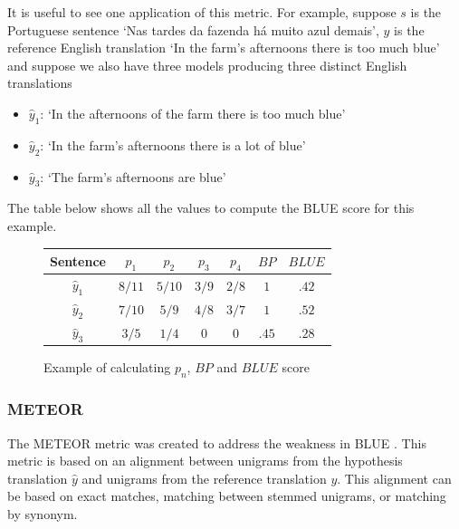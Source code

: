 It is useful to see one application of this metric. For example, suppose $s$ is the Portuguese sentence `Nas tardes da fazenda há muito azul demais', $y$ is the reference English translation `In the farm's afternoons there is too much blue' and suppose we also have three models producing three distinct English translations 

\begin{itemize}
\item $\hat{y}_1$: `In the afternoons of the farm there is too much blue'
\item $\hat{y}_2$: `In the farm's afternoons there is a lot of blue'
\item $\hat{y}_3$: `The farm's afternoons are blue'
\end{itemize}


The table below shows all the values to compute the BLUE score for this example.

\begin{figure}[h]
\label{bluetable}
\begin{center}
\begin{tabular}{|c|c|c|c|c|c|c|}
\hline
\cellcolor{blue!10} Sentence & \cellcolor{blue!10} $p_1$ & \cellcolor{blue!10} $p_2$ & \cellcolor{blue!10} $p_3$ & \cellcolor{blue!10} $p_4$ & \cellcolor{blue!10} $BP$ & \cellcolor{blue!10} $BLUE$ \\ \hline
\cellcolor{blue!10} $\hat{y}_1$ & $8/11$ & $5/10$ & $3/9$ & $2/8$ & $1$ & $.42$\\ \hline
\cellcolor{blue!10} $\hat{y}_2$ & $7/10$ & $5/9$ & $4/8$ & $3/7$ & $1$ & $.52$\\ \hline
\cellcolor{blue!10} $\hat{y}_3$ & $3/5$ & $1/4$ & $0$ & $0$ & $.45$ & $.28$\\ \hline
\end{tabular}
\end{center}
\caption{Example of calculating $p_n$, $BP$ and $BLUE$ score}
\end{figure}

\subsubsection{METEOR}



The METEOR metric was created to address the weakness in BLUE \cite{Lavie}. This metric is based on an alignment between unigrams from the hypothesis translation $\hat{y}$ and unigrams from the reference translation $y$. This alignment can be based on exact matches, matching between stemmed unigrams, or matching by synonym.

